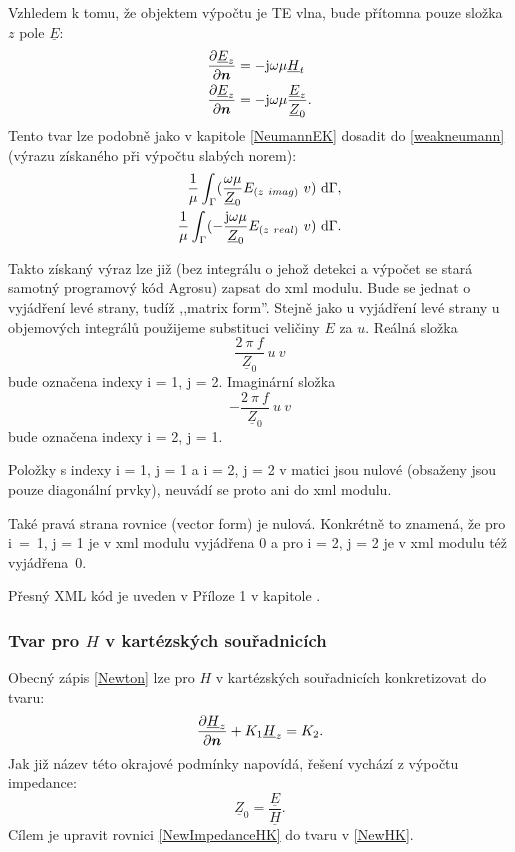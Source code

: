 \documentclass[12pt,a4paper,oneside]{article}
\numberwithin{equation}{section} %
\numberwithin{figure}{section} %
\numberwithin{table}{section} %
\newcommand{\mj}{\mathrm{j}} %
\renewcommand{\vec}[1]{\mbox{\boldmath$#1$}} %
\newcommand{\faz}[1]{{\underline{#1}}} %
\begin{document}
Vzhledem k tomu, že objektem výpočtu je TE vlna, bude přítomna pouze složka $z$ pole $\faz{E}$:
\begin{subequations}
\begin{align}
\frac{\partial \faz{E} _z}{\partial \vec{n}} &= - \mj \omega \mu \faz{H} _t
\\
\frac{\partial \faz{E} _z}{\partial \vec{n}} &= - \mj \omega \mu \frac{\faz{E} _z}{\faz{Z} _0} .
\end{align}
\end{subequations}
Tento tvar lze podobně jako v kapitole \ref{NeumannEK} dosadit do \ref{weakneumann} (výrazu získaného při výpočtu slabých norem):
\begin{subequations}
\begin{align}
\frac{1}{\mu} \int _{\Gamma} ( \frac{\omega \mu}{\faz{Z} _0} E _{(z~imag)} ~ v ) ~ \ud \Gamma ,
\\ 
\frac{1}{\mu} \int _{\Gamma} ( - \frac{\mj \omega \mu}{\faz{Z} _0} E _{(z~real)} ~ v ) ~ \ud \Gamma .
\end{align}
\end{subequations}

Takto získaný výraz lze již (bez integrálu o jehož detekci a výpočet se stará samotný programový kód Agrosu) zapsat do xml modulu. Bude se jednat o vyjádření levé strany, tudíž ,,matrix form''. Stejně jako u vyjádření levé strany u objemových integrálů použijeme substituci veličiny $E$ za $u$. Reálná složka 
\begin{equation}
\frac{2 ~ \pi ~ f}{\faz{Z} _0} ~ u ~ v
\end{equation} 
bude označena indexy i = 1, j = 2. Imaginární složka 
\begin{equation}
- \frac{2 ~ \pi ~ f}{\faz{Z} _0} ~ u ~ v
\end{equation}
bude označena indexy i = 2, j = 1.

Položky s indexy i = 1, j = 1 a i = 2, j = 2 v matici jsou nulové (obsaženy jsou pouze diagonální prvky), neuvádí se proto ani do xml modulu.

Také pravá strana rovnice (vector form) je nulová. Konkrétně to znamená, že pro i~=~1, j = 1 je v xml modulu vyjádřena $0$ a pro i = 2, j = 2 je v xml modulu též vyjádřena~$0$.

Přesný XML kód je uveden v Příloze 1 v kapitole .


\subsubsection*{Tvar pro \faz{\vec{H}} v kartézských souřadnicích}
Obecný zápis \ref{Newton} lze pro \faz{\vec{H}} v kartézských souřadnicích konkretizovat do tvaru:
\begin{equation}
\label{NewHK}
\frac{\partial \faz{H} _z}{\partial \vec{n}} + K_1 \faz{H} _z = K_2 .
\end{equation}
Jak již název této okrajové podmínky napovídá, řešení vychází z výpočtu impedance: 
\begin{equation}
\label{NewImpedanceHK}
\faz{Z} _0 = \frac{\faz{E}}{\faz{H}} .
\end{equation}
Cílem je upravit rovnici \ref{NewImpedanceHK} do tvaru v \ref{NewHK}.
\end{document}
